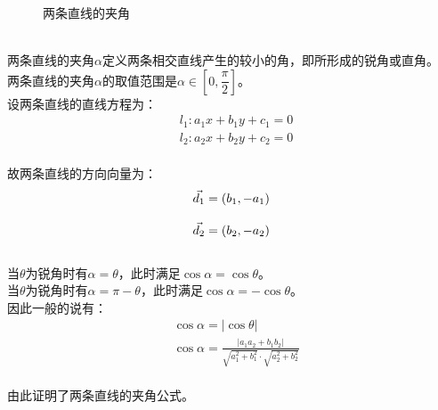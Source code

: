 \documentclass[UTF8]{ctexart}
\let\nvec\vec
\def\vec#1{\nvec{\vphantom b\smash{#1}}}
\begin{document}
\begin{figure}[h]
\begin{center}
{
            }
            \caption{两条直线的夹角}
        \end{center}
    \end{figure}\\
    两条直线的夹角$\alpha$定义两条相交直线产生的较小的角，即所形成的锐角或直角。\\[3mm]
    两条直线的夹角$\alpha$的取值范围是$\alpha\in\left[0,\dfrac{\pi}{2}\right]$。\\[3mm]
    设两条直线的直线方程为：
    \begin{align}
        &l_1:a_1x+b_1y+c_1=0\\[3mm]
        &l_2:a_2x+b_2y+c_2=0
    \end{align}\\
    故两条直线的方向向量为：
    \begin{align}
        &\vec{d_1}=(b_1,-a_1)\\[3mm]
        &\vec{d_2}=(b_2,-a_2)
    \end{align}\\
    当$\theta$为锐角时有$\alpha=\theta$，此时满足$\cos{\alpha}=\cos{\theta}$。\\[3mm]
    当$\theta$为锐角时有$\alpha=\pi-\theta$，此时满足$\cos{\alpha}=-\cos{\theta}$。\\[3mm]
    因此一般的说有：
    \begin{align}
        &\cos{\alpha}=|\cos{\theta}|\\[3mm]
        &\cos{\alpha}=\frac{|a_1a_2+b_1b_2|}{\sqrt{a_1^2+b_1^2}\cdot\sqrt{a_2^2+b_2^2}}
    \end{align}\\
    由此证明了两条直线的夹角公式。
    
\newpage
\end{document}
